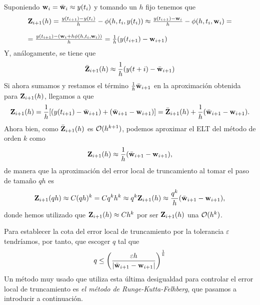 Suponiendo $\vb{w}{}_i = \bar{\vb{w}{}}_i \approx y(t_i)$ y tomando un $h$ fijo tenemos que
\begin{equation*}
\begin{array}{l}
    \vb{Z}{}_{i+1}(h) = \frac{y(t_{i+1}) - y(t_i)}{h} - \phi(h, t_i, y(t_i)) \approx  \frac{y(t_{i+1}) - \vb{w}{}_i}{h} - \phi(h, t_i, \vb{w}{}_i) =\\
    \\
     =\frac{y(t_{i+1}) - (\vb{w}{}_i + h\phi(h, t_i, \vb{w}{}_i))}{h} = \frac{1}{h}(y(t_{i+1})-\vb{w}{}_{i+1})
\end{array}
\end{equation*}
Y, análogamente, se tiene que 
\begin{equation*}
    \bar{\vb{Z}{}}_{i+1}(h) \approx \frac{1}{h}(y(t+i)-\bar{\vb{w}{}}_{i+1})
\end{equation*}
Si ahora sumamos y restamos el término $\frac{1}{h}\bar{\vb{w}{}}_{i+1}$
en la aproximación obtenida para $\vb{Z}{}_{i+1}(h)$,
llegamos a que
\begin{equation*}
    \vb{Z}{}_{i+1}(h) = \frac{1}{h}[(y(t_{i+1})-\bar{\vb{w}{}}_{i+1}) + (\bar{\vb{w}{}}_{i+1} - \vb{w}{}_{i+1})] = \bar{\vb{Z}{}}_{i+1}(h) + \frac{1}{h}(\bar{\vb{w}{}}_{i+1}-\vb{w}{}_{i+1}).
\end{equation*}
Ahora bien, como $\bar{\vb{Z}{}}_{i+1}(h)$ es $\vb{\mathcal{O}}{}(h^{k+1})$,
podemos aproximar el ELT del método de orden $k$ como
\begin{equation*}
\vb{Z}{}_{i+1}(h) \approx \frac{1}{h}(\bar{\vb{w}{}}_{i+1}-\vb{w}{}_{i+1}),
\end{equation*}
de manera que la aproximación del error local de truncamiento
al tomar el paso de tamaño $qh$ es
\begin{equation*}
    \vb{Z}{}_{i+1}(qh)\approx C(qh)^k = Cq^kh^k \approx q^k \vb{Z}{}_{i+1}(h) \approx \frac{q^k}{h}(\bar{\vb{w}{}}_{i+1}-\vb{w}{}_{i+1}),
\end{equation*}
donde hemos utilizado que $\vb{Z}{}_{i+1}(h) \approx Ch^k$
por ser $\vb{Z}{}_{i+1}(h)$ una $\vb{\mathcal{O}}{}(h^k)$.

Para establecer la cota del error local de truncamiento
por la tolerancia $\varepsilon$ tendríamos, por tanto,
que escoger $q$ tal que
\begin{equation*}
    q \leq \left(\frac{\varepsilon h}{|\bar{\vb{w}{}}_{i+1} - \vb{w}{}_{i+1}|}\right)^{\frac{1}{k}}
\end{equation*}
Un método muy usado que utiliza esta última desigualdad para
controlar el error local de truncamiento es
\emph{el método de Runge-Kutta-Felhberg},
que pasamos a introducir a continuación.

